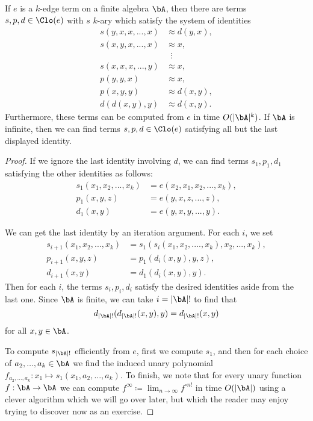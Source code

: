 \begin{thm}\label{edge-spd} If $e$ is a $k$-edge term on a finite algebra $\bA$, then there are terms $s,p,d \in \Clo(e)$ with $s$ $k$-ary which satisfy the system of identities
\begin{align*}
s(y,x,x,...,x) &\approx d(y,x),\\
s(x,y,x,...,x) &\approx x,\\
&\;\; \vdots\\
s(x,x,x,...,y) &\approx x,\\
p(y,y,x) &\approx x,\\
p(x,y,y) &\approx d(x,y),\\
d(d(x,y),y) &\approx d(x,y).
\end{align*}
Furthermore, these terms can be computed from $e$ in time $O(|\bA|^k)$. If $\bA$ is infinite, then we can find terms $s,p,d \in \Clo(e)$ satisfying all but the last displayed identity.
\end{thm}
\begin{proof} If we ignore the last identity involving $d$, we can find terms $s_1,p_1,d_1$ satisfying the other identities as follows:
\begin{align*}
s_1(x_1, x_2, ..., x_k) &= e(x_2,x_1,x_2, ..., x_k),\\
p_1(x,y,z) &= e(y,x,z,...,z),\\
d_1(x,y) &= e(y,x,y,...,y).
\end{align*}

We can get the last identity by an iteration argument. For each $i$, we set
\begin{align*}
s_{i+1}(x_1,x_2, ..., x_k) &= s_1(s_i(x_1,x_2,....,x_k),x_2,...,x_k),\\
p_{i+1}(x,y,z) &= p_1(d_i(x,y),y,z),\\
d_{i+1}(x,y) &= d_1(d_i(x,y),y).
\end{align*}
Then for each $i$, the terms $s_i,p_i,d_i$ satisfy the desired identities aside from the last one. Since $\bA$ is finite, we can take $i = |\bA|!$ to find that
\[
d_{|\bA|!}(d_{|\bA|!}(x,y),y) = d_{|\bA|!}(x,y)
\]
for all $x,y \in \bA$.

To compute $s_{|\bA|!}$ efficiently from $e$, first we compute $s_1$, and then for each choice of $a_2, ..., a_k \in \bA$ we find the induced unary polynomial $f_{a_2,...,a_k} : x_1 \mapsto s_1(x_1, a_2, ..., a_k)$. To finish, we note that for every unary function $f : \bA \rightarrow \bA$ we can compute $f^{\infty} \coloneqq \lim_{n \rightarrow \infty} f^{\circ n!}$ in time $O(|\bA|)$ using a clever algorithm which we will go over later, but which the reader may enjoy trying to discover now as an exercise.
\end{proof}

